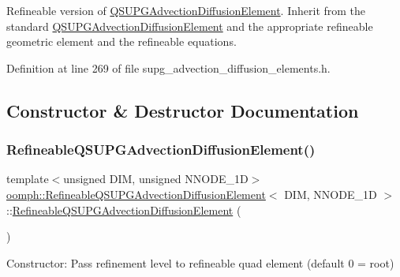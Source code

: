 Refineable version of \hyperlink{classoomph_1_1QSUPGAdvectionDiffusionElement}{Q\+S\+U\+P\+G\+Advection\+Diffusion\+Element}. Inherit from the standard \hyperlink{classoomph_1_1QSUPGAdvectionDiffusionElement}{Q\+S\+U\+P\+G\+Advection\+Diffusion\+Element} and the appropriate refineable geometric element and the refineable equations. 

Definition at line 269 of file supg\+\_\+advection\+\_\+diffusion\+\_\+elements.\+h.



\subsection{Constructor \& Destructor Documentation}
\mbox{\label{classoomph_1_1RefineableQSUPGAdvectionDiffusionElement_ac8e2bbbe03bcbe7022a84a4e1c670c59}} 
\subsubsection{\texorpdfstring{Refineable\+Q\+S\+U\+P\+G\+Advection\+Diffusion\+Element()}{RefineableQSUPGAdvectionDiffusionElement()}\hspace{0.1cm}{\footnotesize\ttfamily [1/2]}}
{\footnotesize\ttfamily template$<$unsigned D\+IM, unsigned N\+N\+O\+D\+E\+\_\+1D$>$ \\
\hyperlink{classoomph_1_1RefineableQSUPGAdvectionDiffusionElement}{oomph\+::\+Refineable\+Q\+S\+U\+P\+G\+Advection\+Diffusion\+Element}$<$ D\+IM, N\+N\+O\+D\+E\+\_\+1D $>$\+::\hyperlink{classoomph_1_1RefineableQSUPGAdvectionDiffusionElement}{Refineable\+Q\+S\+U\+P\+G\+Advection\+Diffusion\+Element} (\begin{DoxyParamCaption}{ }\end{DoxyParamCaption})\hspace{0.3cm}{\ttfamily [inline]}}



Constructor\+: Pass refinement level to refineable quad element (default 0 = root) 



